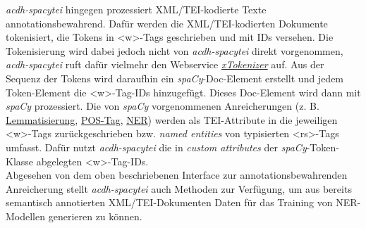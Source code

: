 \documentclass{article}
\begin{document}
        \emph{acdh-spacytei} hingegen prozessiert XML/TEI-kodierte Texte
                  annotationsbewahrend. Dafür werden die XML/TEI-kodierten Dokumente tokenisiert,
                  die Tokens in <w>-Tags geschrieben und mit
                  IDs versehen. Die Tokenisierung wird dabei jedoch nicht von \emph{acdh-spacytei} direkt vorgenommen, \emph{acdh-spacytei}
                  ruft dafür vielmehr den Webservice \emph{\href{http://gams.uni-graz.at/o:konde.216}{xTokenizer}} auf. Aus der Sequenz der Tokens wird daraufhin ein \emph{spaCy}-Doc-Element erstellt und jedem Token-Element die <w>-Tag-IDs hinzugefügt. Dieses Doc-Element wird
                  dann mit \emph{spaCy} prozessiert. Die von \emph{spaCy} vorgenommenen Anreicherungen (z. B. \href{http://gams.uni-graz.at/o:konde.115}{Lemmatisierung}, \href{http://gams.uni-graz.at/o:konde.156}{POS-Tag}, \href{http://gams.uni-graz.at/o:konde.141}{NER}) werden als TEI-Attribute in die jeweiligen <w>-Tags zurückgeschrieben bzw. \emph{named
                     entities} von typisierten <rs>-Tags
                  umfasst. Dafür nutzt \emph{acdh-spacytei} die in \emph{custom attributes} der \emph{spaCy}-Token-Klasse
                  abgelegten <w>-Tag-IDs.\\
            
        Abgesehen von dem oben beschriebenen Interface zur annotationsbewahrenden
                  Anreicherung stellt \emph{acdh-spacytei} auch Methoden zur
                  Verfügung, um aus bereits semantisch annotierten XML/TEI-Dokumenten Daten für das
                  Training von NER-Modellen generieren zu können. \\
            
\end{document}
